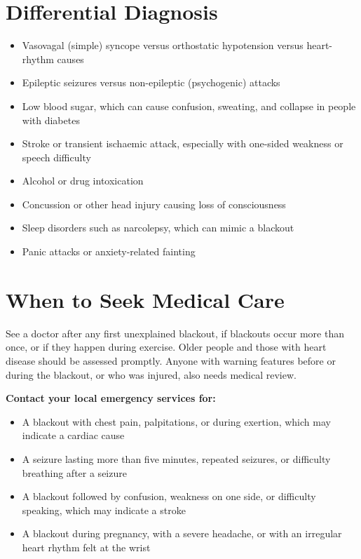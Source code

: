 \section*{Differential Diagnosis}
\begin{itemize}
    \item Vasovagal (simple) syncope versus orthostatic hypotension versus heart-rhythm causes
    \item Epileptic seizures versus non-epileptic (psychogenic) attacks
    \item Low blood sugar, which can cause confusion, sweating, and collapse in people with diabetes
    \item Stroke or transient ischaemic attack, especially with one-sided weakness or speech difficulty
    \item Alcohol or drug intoxication
    \item Concussion or other head injury causing loss of consciousness
    \item Sleep disorders such as narcolepsy, which can mimic a blackout
    \item Panic attacks or anxiety-related fainting
\end{itemize}

\section*{When to Seek Medical Care}
See a doctor after any first unexplained blackout, if blackouts occur more than once, or if they happen during exercise. Older people and those with heart disease should be assessed promptly. Anyone with warning features before or during the blackout, or who was injured, also needs medical review.

\textbf{Contact your local emergency services for:}
\begin{itemize}
    \item A blackout with chest pain, palpitations, or during exertion, which may indicate a cardiac cause
    \item A seizure lasting more than five minutes, repeated seizures, or difficulty breathing after a seizure
    \item A blackout followed by confusion, weakness on one side, or difficulty speaking, which may indicate a stroke
    \item A blackout during pregnancy, with a severe headache, or with an irregular heart rhythm felt at the wrist
\end{itemize}

